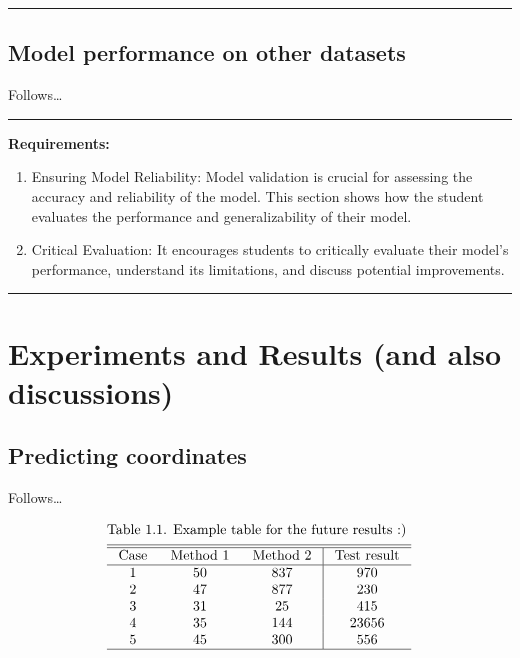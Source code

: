 \begin{center}\rule{0.5\linewidth}{0.5pt}\end{center}

\subsection{Model performance on other
datasets}\label{model-performance-on-other-datasets}

Follows\ldots{}

\begin{center}\rule{0.5\linewidth}{0.5pt}\end{center}

\textbf{Requirements:}

\begin{enumerate}
\def\labelenumi{\arabic{enumi}.}
\tightlist
\item
  Ensuring Model Reliability: Model validation is crucial for assessing
  the accuracy and reliability of the model. This section shows how the
  student evaluates the performance and generalizability of their model.
\item
  Critical Evaluation: It encourages students to critically evaluate
  their model's performance, understand its limitations, and discuss
  potential improvements.
\end{enumerate}

\begin{center}\rule{0.5\linewidth}{0.5pt}\end{center}

\section{Experiments and Results (and also
discussions)}\label{experiments-and-results-and-also-discussions}

\subsection{Predicting coordinates}\label{predicting-coordinates}

Follows\ldots{}

\[
\begin{aligned} & \text {Table 1.1. Example table for the future results :) }\\ &\begin{array}{ccc|c} \hline \hline \text { Case } & \text { Method 1 } & \text { Method 2 } & \text { Test result } \\ \hline 1 & 50 & 837 & 970 \\ 2 & 47 & 877 & 230 \\ 3 & 31 & 25 & 415 \\ 4 & 35 & 144 & 23656 \\ 5 & 45 & 300 & 556 \\ \hline
\end{array} \end{aligned}
\]

